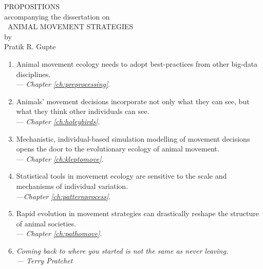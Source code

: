 \begingroup

\clearpage

\begin{doublespace}
    \begin{center}
        {\LARGE \textsf{PROPOSITIONS}} \\
        {\small accompanying the dissertation on}\\
        {\large \adftripleflourishleft~\textsf{ANIMAL MOVEMENT STRATEGIES}~\adftripleflourishright}\\
        by\\
        Pratik R. Gupte\\
    \end{center}
\end{doublespace}

\begin{onehalfspace}
    \begin{enumerate}

        \item Animal movement ecology needs to adopt best-practices from other big-data disciplines.\\ --- \textit{Chapter \ref{ch:preprocessing}}.

        \item Animals' movement decisions incorporate not only what they can see, but what they think other individuals can see.\\ --- \textit{Chapter \ref{ch:holeybirds}}.

        \item Mechanistic, individual-based simulation modelling of movement decisions opens the door to the evolutionary ecology of animal movement. \\ --- \textit{Chapter \ref{ch:kleptomove}}.

        \item Statistical tools in movement ecology are sensitive to the scale and mechanisms of individual variation.\\ ---\textit{Chapter \ref{ch:patternprocess}}.

        \item Rapid evolution in movement strategies can drastically reshape the structure of animal societies.\\ --- \textit{Chapter \ref{ch:pathomove}}.

        \item \textit{Coming back to where you started is not the same as never leaving.\\--- Terry Pratchet}
    \end{enumerate}

\end{onehalfspace}

\endgroup

\vfill

\clearpage
